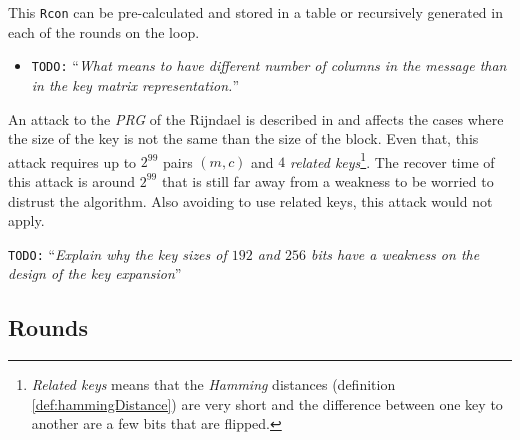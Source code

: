 \documentclass[10pt,a4paper,twoside]{llncs}
\newcommand{\todo}[1]{\texttt{\color{red}TODO:} ``\emph{#1}''}
\begin{document}
This {\tt Rcon} can be pre-calculated and stored in a table or recursively generated in each of the rounds on the loop.

\begin{itemize}
 \item \todo{What means to have different number of columns in the message than in the key matrix representation.}
\end{itemize}

An attack to the \emph{PRG} of the Rijndael is described in \cite{fullaes-192-256} and affects the cases where the size of the key is not the same than the size of the block. Even that, this attack requires up to $2^{99}$ pairs $(m,c)$ and $4$ \emph{related keys}\footnote{\emph{Related keys} means that the \emph{Hamming} distances (definition \ref{def:hammingDistance}) are very short and the difference between one key to another are a few bits that are flipped.}. The recover time of this attack is around $2^{99}$ that is still far away from a weakness to be worried to distrust the algorithm. Also avoiding to use related keys, this attack would not apply.

\todo{Explain why the key sizes of $192$ and $256$ bits have a weakness on the design of the key expansion}

\subsection{Rounds}\label{sec:rounds}
\end{document}

